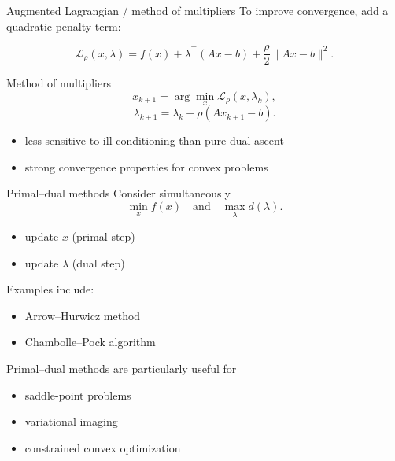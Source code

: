 \documentclass[aspectratio=169]{beamer}
\begin{document}

\begin{frame}{Augmented Lagrangian / method of multipliers}
To improve convergence, add a quadratic penalty term:

\[
\mathcal{L}_\rho(x,\lambda)
=
f(x)+\lambda^\top (Ax-b)
+
\frac{\rho}{2}\|Ax-b\|^2.
\]
\pause
\begin{block}{Method of multipliers}
\[
x_{k+1}
=
\arg\min_x \mathcal{L}_\rho(x,\lambda_k),
\]
\[
\lambda_{k+1}
=
\lambda_k + \rho(Ax_{k+1}-b).
\]
\end{block}
\pause
\begin{itemize}
    \item less sensitive to ill-conditioning than pure dual ascent
    \item strong convergence properties for convex problems
\end{itemize}
\end{frame}


\begin{frame}{Primal–dual methods}
Consider simultaneously
\[
\min_x f(x)\quad\text{and}\quad\max_\lambda d(\lambda).
\]
\pause
\begin{itemize}
    \item update $x$ (primal step)
    \item update $\lambda$ (dual step)
\end{itemize}
\pause
Examples include:
\begin{itemize}
    \item Arrow–Hurwicz method
    \item Chambolle–Pock algorithm
\end{itemize}
\pause
Primal–dual methods are particularly useful for
\begin{itemize}
    \item saddle-point problems
    \item variational imaging
    \item constrained convex optimization
\end{itemize}
\end{frame}

\end{document}
